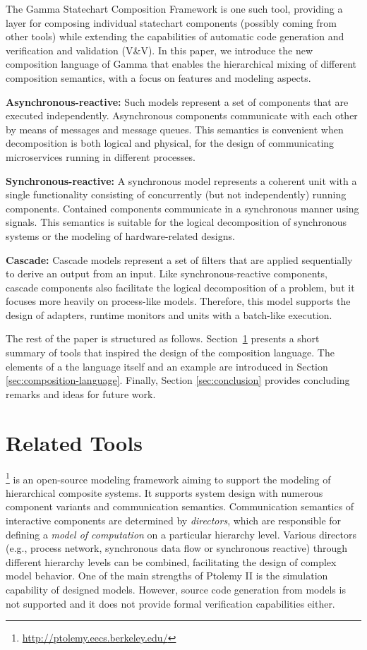 The Gamma Statechart Composition Framework is one such tool, providing a layer for composing individual statechart components (possibly coming from other tools) while extending the capabilities of automatic code generation and verification and validation (V\&V). In this paper, we introduce the new composition language of Gamma that enables the hierarchical mixing of different composition semantics, with a focus on features and modeling aspects.

\textbf{Asynchronous-reactive:} Such models represent a set of components that are executed independently. Asynchronous components communicate with each other by means of messages and message queues. This semantics is convenient when decomposition is both logical and physical, \eg for the design of communicating microservices running in different processes.
	
\textbf{Synchronous-reactive:} A synchronous model represents a coherent unit with a single functionality consisting of concurrently (but not independently) running components. Contained components communicate in a synchronous manner using signals. This semantics is suitable for the logical decomposition of synchronous systems or the modeling of hardware-related designs.
	
\textbf{Cascade:} Cascade models represent a set of filters that are applied sequentially to derive an output from an input. Like synchronous-reactive components, cascade components also facilitate the logical decomposition of a problem, but it focuses more heavily on process-like models. Therefore, this model supports the design of adapters, runtime monitors and units with a batch-like execution.

The rest of the paper is structured as follows. Section~\ref{sec:related-tools} presents a short summary of tools that inspired the design of the composition language. The elements of a the language itself and an example are introduced in Section \ref{sec:composition-language}. Finally, Section \ref{sec:conclusion} provides concluding remarks and ideas for future work.

\section{Related Tools}
\label{sec:related-tools}

\ptolemy\footnote{\url{http://ptolemy.eecs.berkeley.edu/}} \cite{ptolemy,ptolemy2} is an open-source modeling framework aiming to support
the modeling of hierarchical composite systems. It supports system design with numerous component variants and communication semantics. Communication semantics of interactive components are determined by \emph{directors}, which are responsible for defining a \emph{model of computation} on a particular hierarchy level. Various directors (e.g., process network, synchronous data flow
or synchronous reactive) through different hierarchy levels can be combined, facilitating the design of complex model behavior. One of the main strengths of Ptolemy II is the simulation capability of designed models. However, source code generation from models is not supported and it does not provide formal verification capabilities either.

